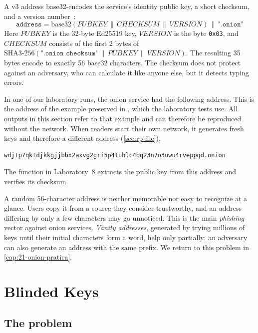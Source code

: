 A v3 address base32-encodes the service's identity public key, a short checksum, and a version number~:
\[
\texttt{address} = \mathrm{base32}(\mathit{PUBKEY} \,\|\, \mathit{CHECKSUM} \,\|\, \mathit{VERSION}) \,\|\, \texttt{".onion"}
\]
Here $\mathit{PUBKEY}$ is the 32-byte Ed25519 key, $\mathit{VERSION}$ is the byte \texttt{0x03}, and $\mathit{CHECKSUM}$ consists of the first 2 bytes of $\mathrm{SHA3\text{-}256}(\texttt{".onion checksum"} \,\|\, \mathit{PUBKEY} \,\|\, \mathit{VERSION})$. The resulting 35 bytes encode to exactly 56 base32 characters. The checksum does not protect against an adversary, who can calculate it like anyone else, but it detects typing errors.

In one of our laboratory runs, the onion service had the following address. This is the address of the example preserved in , which the laboratory tests use. All outputs in this section refer to that example and can therefore be reproduced without the network. When readers start their own network, it generates fresh keys and therefore a different address (\cref{sec:rp-file}).
\begin{lstlisting}[numbers=none]
wdjtp7qktdjkkgjjbbx2axvg2gri5p4tuhlc4bq23n7o3uwu4rveppqd.onion
\end{lstlisting}
The  function in Laboratory~8 extracts the public key from this address and verifies its checksum.

\begin{attenzione}
A random 56-character address is neither memorable nor easy to recognize at a glance. Users copy it from a source they consider trustworthy, and an address differing by only a few characters may go unnoticed. This is the main \emph{phishing} vector against onion services. \emph{Vanity addresses}, generated by trying millions of keys until their initial characters form a word, help only partially: an adversary can also generate an address with the same prefix. We return to this problem in \cref{cap:21-onion-pratica}.
\end{attenzione}

\section{Blinded Keys}\label{sec:os-accecate}

\subsection{The problem}

